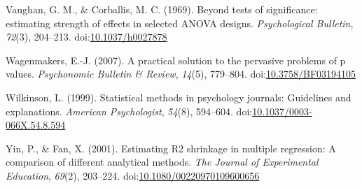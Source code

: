 \documentclass[english,man]{apa6}
\theoremstyle{definition}
\theoremstyle{definition}
\theoremstyle{definition}
\theoremstyle{remark}
\begin{document}
\hypertarget{ref-Vaughan1969}{}
Vaughan, G. M., \& Corballis, M. C. (1969). Beyond tests of
significance: estimating strength of effects in selected ANOVA designs.
\emph{Psychological Bulletin}, \emph{72}(3), 204--213.
doi:\href{https://doi.org/10.1037/h0027878}{10.1037/h0027878}

\hypertarget{ref-Wagenmakers2007}{}
Wagenmakers, E.-J. (2007). A practical solution to the pervasive
problems of p values. \emph{Psychonomic Bulletin \& Review},
\emph{14}(5), 779--804.
doi:\href{https://doi.org/10.3758/BF03194105}{10.3758/BF03194105}

\hypertarget{ref-Wilkinson1999}{}
Wilkinson, L. (1999). Statistical methods in psychology journals:
Guidelines and explanations. \emph{American Psychologist}, \emph{54}(8),
594--604.
doi:\href{https://doi.org/10.1037/0003-066X.54.8.594}{10.1037/0003-066X.54.8.594}

\hypertarget{ref-Yin2001}{}
Yin, P., \& Fan, X. (2001). Estimating R2 shrinkage in multiple
regression: A comparison of different analytical methods. \emph{The
Journal of Experimental Education}, \emph{69}(2), 203--224.
doi:\href{https://doi.org/10.1080/00220970109600656}{10.1080/00220970109600656}
\end{document}
